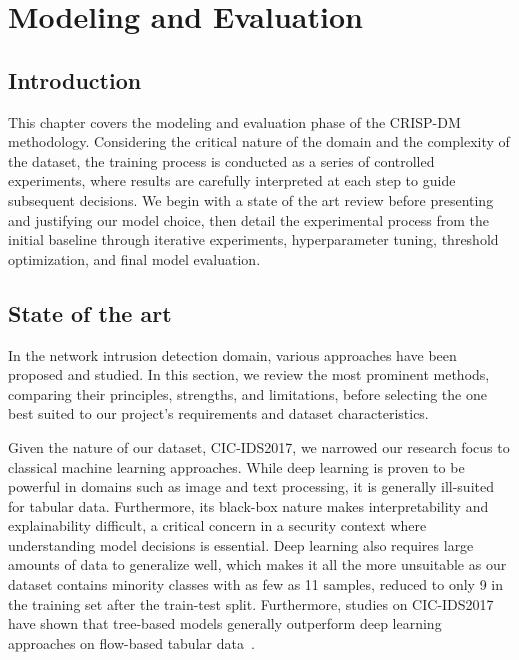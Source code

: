 \chapter{Modeling and Evaluation}

\section{Introduction}

This chapter covers the modeling and evaluation phase of the CRISP-DM methodology. Considering the critical nature of the domain and the complexity of the dataset, the training process is conducted as a series of controlled experiments, where results are carefully interpreted at each step to guide subsequent decisions. We begin with a state of the art review before presenting and justifying our model choice, then detail the experimental process from the initial baseline through iterative experiments, hyperparameter tuning, threshold optimization, and final model evaluation.

\section{State of the art}

In the network intrusion detection domain, various approaches have been proposed and studied. In this section, we review the most prominent methods, comparing their principles, strengths, and limitations, before selecting the one best suited to our project's requirements and dataset characteristics.

Given the nature of our dataset, CIC-IDS2017, we narrowed our research focus to classical machine learning approaches. While deep learning is proven to be powerful in domains such as image and text processing, it is generally ill-suited for tabular data. Furthermore, its black-box nature makes interpretability and explainability difficult, a critical concern in a security context where understanding model decisions is essential. Deep learning also requires large amounts of data to generalize well, which makes it all the more unsuitable as our dataset contains minority classes with as few as 11 samples, reduced to only 9 in the training set after the train-test split. Furthermore, studies on CIC-IDS2017 have shown that tree-based models generally outperform deep learning approaches on flow-based tabular data~\cite{DL-NID}.

